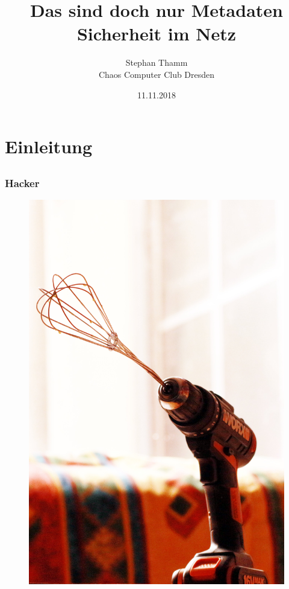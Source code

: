 \documentclass[12pt]{beamer}
\title{Das sind doch nur Metadaten \\ Sicherheit im Netz}
\author{\small Stephan Thamm\\\large Chaos Computer Club Dresden}
\date{11.11.2018}
\begin{document}
\maketitle

\section{Einleitung}
\subsection{}

\begin{frame}
  \frametitle{Hacker}
  \pause
  \begin{figure}
    \includegraphics[height=0.7\textheight]{img/schneeschrauber.jpg}
  \end{figure}
\end{frame}  
\end{document}
